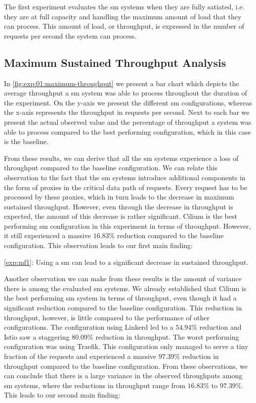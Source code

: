 The first experiment evaluates the \gls{sm} systems when they are fully satiated, i.e. they are at full capacity and handling the maximum amount of load that they can process. This amount of load, or throughput, is expressed in the number of requests per second the system can process.

\subsection{Maximum Sustained Throughput Analysis}
\label{sec:experiments:results:per-experiment:01:throughput}

In \cref{fig:exp:01:maximum-throughput} we present a bar chart which depicts the average throughput a \gls{sm} system was able to process throughout the duration of the experiment. On the y-axis we present the different \gls{sm} configurations, whereas the x-axis represents the throughput in requests per second. Next to each bar we present the actual observed value and the percentage of throughput a system was able to process compared to the  best performing configuration, which in this case is the baseline.

From these results, we can derive that all the \gls{sm} systems experience a loss of throughput compared to the baseline configuration. We can relate this observation to the fact that the \gls{sm} systems introduce additional components in the form of proxies in the critical data path of requests. Every request has to be processed by these proxies, which in turn leads to the decrease in maximum sustained throughput. However, even through the decrease in throughput is expected, the amount of this decrease is rather significant. Cilium is the best performing \gls{sm} configuration in this experiment in terms of throughput. However, it still experienced a massive $16.83\%$ reduction compared to the baseline configuration. This observation leads to our first main finding: 

\begin{shaded*}
    \noindent
    \ref{exp:mf1}: 
    Using a \gls{sm} can lead to a significant decrease in sustained throughput.
\end{shaded*}

Another observation we can make from these results is the amount of variance there is among the evaluated \gls{sm} systems. We already established that Cilium is the best performing \gls{sm} system in terms of throughput, even though it had a significant reduction compared to the baseline configuration. This reduction in throughput, however, is little compared to the performance of other configurations. The configuration using Linkerd led to a $54.94\%$ reduction and Istio saw a staggering $80.09\%$ reduction in throughput. The worst performing configuration was using Traefik. This configuration only managed to serve a tiny fraction of the requests and experienced a massive $97.39\%$ reduction in throughput compared to the baseline configuration. From these observations, we can conclude that there is a large variance in the observed throughputs among \gls{sm} systems, where the reductions in throughput range from $16.83\%$ to $97.39\%$. This leads to our second main finding:

